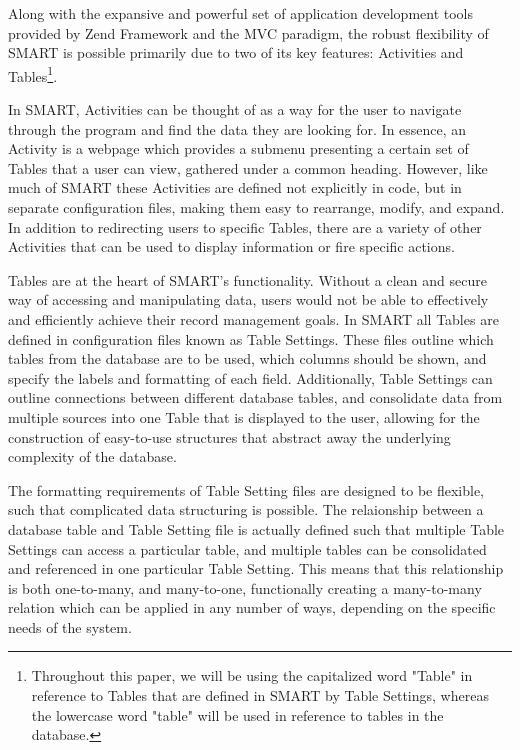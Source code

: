 \documentclass[12pt]{article}
\begin{document}
Along with the expansive and powerful set of application development tools provided by Zend Framework and the MVC paradigm, the robust flexibility of SMART is possible primarily due to two of its key features: Activities and Tables\footnote{Throughout this paper, we will be using the capitalized word "Table" in reference to Tables that are defined in SMART by Table Settings, whereas the lowercase word "table" will be used in reference to tables in the database.}. 

In SMART, Activities can be thought of as a way for the user to navigate through the program and find the data they are looking for. In essence, an Activity is a webpage which provides a submenu presenting a certain set of Tables that a user can view, gathered under a common heading. However, like much of SMART these Activities are defined not explicitly in code, but in separate configuration files, making them easy to rearrange, modify, and expand. In addition to redirecting users to specific Tables, there are a variety of other Activities that can be used to display information or fire specific actions. %

Tables are at the heart of SMART's functionality. Without a clean and secure way of accessing and manipulating data, users would not be able to effectively and efficiently achieve their record management goals. In SMART all Tables are defined in configuration files known as Table Settings. These files outline which tables from the database are to be used, which columns should be shown, and specify the labels and formatting of each field. Additionally, Table Settings can outline connections between different database tables, and consolidate data from multiple sources into one Table that is displayed to the user, allowing for the construction of easy-to-use structures that abstract away the underlying complexity of the database. %

The formatting requirements of Table Setting files are designed to be flexible, such that complicated data structuring is possible. The relaionship between a database table and Table Setting file is actually defined such that multiple Table Settings can access a particular table, and multiple tables can be consolidated and referenced in one particular Table Setting. This means that this relationship is both one-to-many, and many-to-one, functionally creating a many-to-many relation which can be applied in any number of ways, depending on the specific needs of the system.
\end{document}
